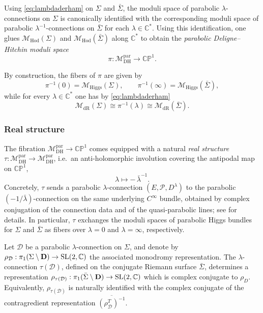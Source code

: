 \documentclass[12pt,a4paper]{amsart}
\theoremstyle{definition}
\theoremstyle{remark}
\newcommand{\C}{\mathbb C}
\newcommand{\CP}{\mathbb{CP}}
\newcommand{\Mcal}{\mathcal M}
\newcommand{\Pcal}{\mathcal P}
\begin{document}
Using \eqref{eq:lambdaderham} on $\Sigma$ and $\bar\Sigma$,  the moduli space of parabolic
$\lambda$-connections on $\Sigma$ is canonically identified with the corresponding
moduli space of parabolic
$\lambda^{-1}$-connections on $\bar{\Sigma}$ for each $\lambda\in\C^*$.
Using this identification, one glues $\Mcal_{\mathrm{Hod}}(\Sigma)$ and
$\Mcal_{\mathrm{Hod}}(\bar{\Sigma})$ along $\C^*$ to obtain the
\emph{parabolic Deligne--Hitchin moduli space}
\[
\pi \colon \Mcal_{\mathrm{DH}}^{\mathrm{par}} \to \CP^1.
\]
 
 By construction, the fibers of $\pi$ are given by
\[
\pi^{-1}(0) = \Mcal_{\mathrm{Higgs}}(\Sigma), \qquad
\pi^{-1}(\infty) = \Mcal_{\mathrm{Higgs}}(\bar{\Sigma}),
\]
while for every $\lambda\in\C^*$ one has by \eqref{eq:lambdaderham}
\[
\Mcal_{\mathrm{dR}} (\Sigma)\cong\pi^{-1}(\lambda) \cong \Mcal_{\mathrm{dR}} (\bar \Sigma).
\]

 
\subsubsection*{Real structure}
  The fibration $\Mcal_{\mathrm{DH}}^{\mathrm{par}}\to\CP^1$ 
comes equipped with a natural \emph{real structure} $\tau\colon \Mcal_{\mathrm{DH}}^{\mathrm{par}}\to\Mcal_{\mathrm{DH}}^{\mathrm{par}}$, i.e.\ an anti-holomorphic
involution covering the antipodal map on $\CP^1$,
\[
\lambda \longmapsto -\,\bar{\lambda}^{-1}.
\]
Concretely, $\tau$ sends a parabolic $\lambda$-connection $(E,\Pcal,D^\lambda)$ to the
parabolic $(-1/\bar{\lambda})$-connection on the same underlying $C^\infty$ bundle,
obtained by complex conjugation of the connection data and 
of the quasi-parabolic lines;
see \cite[Sections~2.3--2.4]{HellerHellerTraizet2025} for details.
In particular, $\tau$ exchanges the moduli spaces of parabolic Higgs bundles for $\Sigma$ and $\bar{\Sigma}$ 
as fibers over $\lambda=0$ and $\lambda=\infty$, respectively.

Let \(\mathcal D\) be a parabolic \(\lambda\)-connection on \(\Sigma\), and denote by 
\(\rho_{\mathcal D}:\pi_1(\Sigma\setminus{\bf D})\to \mathrm{SL}(2,\C)\) the associated monodromy 
representation. The \(\lambda\)-connection \(\tau(\mathcal D)\), defined on the conjugate 
Riemann surface \(\bar\Sigma\), determines a representation 
\(\rho_{\tau(\mathcal D)}:\pi_1(\bar\Sigma\setminus{\bf D})\to \mathrm{SL}(2,\C)\) which is 
complex conjugate to \(\rho_D\). Equivalently, \(\rho_{\tau(\mathcal D)}\) is naturally 
identified with the complex conjugate of the contragredient representation 
\(\overline{(\rho_{\mathcal D}^{T})^{-1}}\). 
\end{document}
